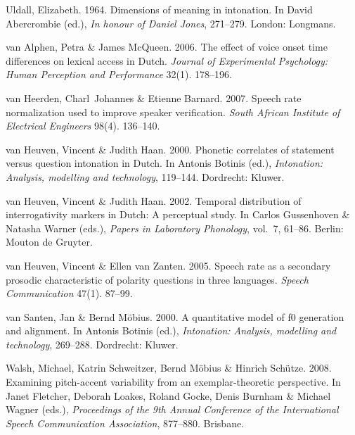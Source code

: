\documentclass[ number=1
,series=labphon
,output=long
,url=http://langsci-press.org/catalog/book/16
,isbn=978-3-944675-01-5
]{LSP/langsci}
\begin{document}
\begin{thebibliography}{284}
Uldall, Elizabeth. 1964.
\newblock Dimensions of meaning in intonation.
\newblock In David Abercrombie (ed.), \emph{In honour of {D}aniel {J}ones},
  271--279. London: Longmans.

{van Alphen}, Petra \& James McQueen. 2006.
\newblock The effect of voice onset time differences on lexical access in
  {D}utch.
\newblock \emph{Journal of Experimental Psychology: Human Perception and
  Performance} 32(1). 178--196.

{van Heerden}, Charl~Johannes \& Etienne Barnard. 2007.
\newblock Speech rate normalization used to improve speaker verification.
\newblock \emph{South African Institute of Electrical Engineers} 98(4).
  136--140.

{van Heuven}, Vincent \& Judith Haan. 2000.
\newblock Phonetic correlates of statement versus question intonation in
  {D}utch.
\newblock In Antonis Botinis (ed.), \emph{Intonation: {A}nalysis, modelling and
  technology}, 119--144. Dordrecht: Kluwer.

{van Heuven}, Vincent \& Judith Haan. 2002.
\newblock Temporal distribution of interrogativity markers in {D}utch: {A}
  perceptual study.
\newblock In Carlos Gussenhoven \& Natasha Warner (eds.), \emph{Papers in
  {L}aboratory {P}honology}, vol.~7, 61--86. Berlin: Mouton de Gruyter.

{van Heuven}, Vincent \& Ellen {van Zanten}. 2005.
\newblock Speech rate as a secondary prosodic characteristic of polarity
  questions in three languages.
\newblock \emph{Speech Communication} 47(1). 87--99.

{van Santen}, Jan \& Bernd M{\"o}bius. 2000.
\newblock A quantitative model of f0 generation and alignment.
\newblock In Antonis Botinis (ed.), \emph{Intonation: {A}nalysis, modelling and
  technology}, 269--288. Dordrecht: Kluwer.

Walsh, Michael, Katrin Schweitzer, Bernd M{\"o}bius \& Hinrich Sch{\"u}tze.
  2008.
\newblock Examining pitch-accent variability from an exemplar-theoretic
  perspective.
\newblock In Janet Fletcher, Deborah Loakes, Roland Gocke, Denis Burnham \&
  Michael Wagner (eds.), \emph{Proceedings of the 9th {Annual Conference of the
  International Speech Communication Association}}, 877--880. Brisbane.


\end{thebibliography}
\end{document}
